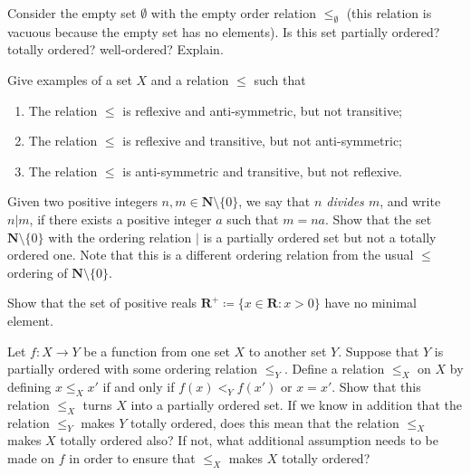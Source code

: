 \exercisesection

\begin{exercise}\label{ex 8.5.1}
    Consider the empty set \(\emptyset\) with the empty order relation \(\leq_\emptyset\)
    (this relation is vacuous because the empty set has no elements).
    Is this set partially ordered? totally ordered? well-ordered? Explain.
\end{exercise}

\begin{exercise}\label{ex 8.5.2}
    Give examples of a set \(X\) and a relation \(\leq\) such that
    \begin{enumerate}
        \item The relation \(\leq\) is reflexive and anti-symmetric, but not transitive;
        \item The relation \(\leq\) is reflexive and transitive, but not anti-symmetric;
        \item The relation \(\leq\) is anti-symmetric and transitive, but not reflexive.
    \end{enumerate}
\end{exercise}

\begin{exercise}\label{ex 8.5.3}
    Given two positive integers \(n, m \in \mathbf{N} \setminus \{0\}\), we say that \emph{\(n\) divides \(m\)}, and write \(n | m\), if there exists a positive integer \(a\) such that \(m = na\).
    Show that the set \(\mathbf{N} \setminus \{0\}\) with the ordering relation \(|\) is a partially ordered set but not a totally ordered one.
    Note that this is a different ordering relation from the usual \(\leq\) ordering of \(\mathbf{N} \setminus \{0\}\).
\end{exercise}

\begin{exercise}\label{ex 8.5.4}
    Show that the set of positive reals \(\mathbf{R}^+ \coloneqq \{x \in \mathbf{R} : x > 0\}\) have no minimal element.
\end{exercise}

\begin{exercise}\label{ex 8.5.5}
    Let \(f : X \to Y\) be a function from one set \(X\) to another set \(Y\).
    Suppose that \(Y\) is partially ordered with some ordering relation \(\leq_Y\).
    Define a relation \(\leq_X\) on \(X\) by defining \(x \leq_X x'\) if and only if \(f(x) <_Y f(x')\) or \(x = x'\).
    Show that this relation \(\leq_X\) turns \(X\) into a partially ordered set.
    If we know in addition that the relation \(\leq_Y\) makes \(Y\) totally ordered, does this mean that the relation \(\leq_X\) makes \(X\) totally ordered also?
    If not, what additional assumption needs to be made on \(f\) in order to ensure that \(\leq_X\) makes \(X\) totally ordered?
\end{exercise}

